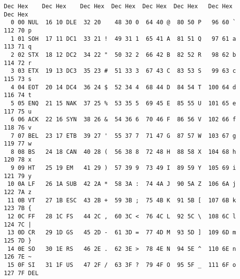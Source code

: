 \documentclass[12pt]{article}
\begin{document}
\begin{verbatim}
Dec Hex    Dec Hex    Dec Hex  Dec Hex  Dec Hex  Dec Hex   Dec Hex   Dec Hex
  0 00 NUL  16 10 DLE  32 20    48 30 0  64 40 @  80 50 P   96 60 `  112 70 p
  1 01 SOH  17 11 DC1  33 21 !  49 31 1  65 41 A  81 51 Q   97 61 a  113 71 q
  2 02 STX  18 12 DC2  34 22 "  50 32 2  66 42 B  82 52 R   98 62 b  114 72 r
  3 03 ETX  19 13 DC3  35 23 #  51 33 3  67 43 C  83 53 S   99 63 c  115 73 s
  4 04 EOT  20 14 DC4  36 24 $  52 34 4  68 44 D  84 54 T  100 64 d  116 74 t
  5 05 ENQ  21 15 NAK  37 25 %  53 35 5  69 45 E  85 55 U  101 65 e  117 75 u
  6 06 ACK  22 16 SYN  38 26 &  54 36 6  70 46 F  86 56 V  102 66 f  118 76 v
  7 07 BEL  23 17 ETB  39 27 '  55 37 7  71 47 G  87 57 W  103 67 g  119 77 w
  8 08 BS   24 18 CAN  40 28 (  56 38 8  72 48 H  88 58 X  104 68 h  120 78 x
  9 09 HT   25 19 EM   41 29 )  57 39 9  73 49 I  89 59 Y  105 69 i  121 79 y
 10 0A LF   26 1A SUB  42 2A *  58 3A :  74 4A J  90 5A Z  106 6A j  122 7A z
 11 0B VT   27 1B ESC  43 2B +  59 3B ;  75 4B K  91 5B [  107 6B k  123 7B {
 12 0C FF   28 1C FS   44 2C ,  60 3C <  76 4C L  92 5C \  108 6C l  124 7C |
 13 0D CR   29 1D GS   45 2D -  61 3D =  77 4D M  93 5D ]  109 6D m  125 7D }
 14 0E SO   30 1E RS   46 2E .  62 3E >  78 4E N  94 5E ^  110 6E n  126 7E ~
 15 0F SI   31 1F US   47 2F /  63 3F ?  79 4F O  95 5F _  111 6F o  127 7F DEL
\end{verbatim}
\end{document}
